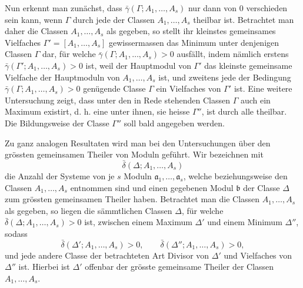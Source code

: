 \documentclass[11pt,a4paper]{article}
\begin{document}
Nun erkennt man zunächst, dass $\bar\gamma(\Gamma;A_1,\ldots,A_s)$ nur dann von 0 verschieden sein kann, wenn $\Gamma$ durch jede der Classen $A_1,\ldots,A_s$ theilbar ist. Betrachtet man daher die Classen $A_1,\ldots,A_s$ als gegeben, so stellt ihr kleinstes gemeinsames Vielfaches $\Gamma'=[A_1,\ldots,A_s]$ gewissermassen das Minimum unter denjenigen Classen $\Gamma$ dar, für welche $\bar\gamma(\Gamma;A_1,\ldots,A_s)>0$ ausfällt, indem nämlich erstens $\bar\gamma(\Gamma';A_1,\ldots,A_s)>0$ ist, weil der Hauptmodul von $\Gamma'$ das kleinste gemeinsame Vielfache der Hauptmoduln von $A_1,\ldots,A_s$ ist, und zweitens jede der Bedingung $\bar\gamma(\Gamma;A_1,\ldots,A_s)>0$ genügende Classe $\Gamma$ ein Vielfaches von $\Gamma'$ ist. Eine weitere Untersuchung zeigt, dass unter den in Rede stehenden Classen $\Gamma$ auch ein Maximum existirt, d. h. eine unter ihnen, sie heisse $\Gamma''$, ist durch alle theilbar. Die Bildungsweise der Classe $\Gamma''$ soll bald angegeben werden.

Zu ganz analogen Resultaten wird man bei den Untersuchungen über den grössten gemeinsamen Theiler von Moduln geführt. Wir bezeichnen mit
\[
 \bar\delta(\Delta;A_1,\ldots,A_s)
\]
die Anzahl der Systeme von je $s$ Moduln $\mathfrak a_1,\ldots,\mathfrak a_s$, welche beziehungsweise den Classen $A_1,\ldots,A_s$ entnommen sind und einen gegebenen Modul $\mathfrak b$ der Classe $\Delta$ zum grössten gemeinsamen Theiler haben. Betrachtet man die Classen $A_1,\ldots,A_s$ als gegeben, so liegen die sämmtlichen Classen $\Delta$, für welche $\bar\delta(\Delta;A_1,\ldots,A_s)>0$ ist, zwischen einem Maximum $\Delta'$ und einem Minimum $\Delta''$, sodass
\[
 \bar\delta(\Delta';A_1,\ldots,A_s)>0,
 \qquad
 \bar\delta(\Delta'';A_1,\ldots,A_s)>0,
\]
und jede andere Classe der betrachteten Art Divisor von $\Delta'$ und Vielfaches von $\Delta''$ ist. Hierbei ist $\Delta'$ offenbar der grösste gemeinsame Theiler der Classen $A_1,\ldots,A_s$.
\end{document}

